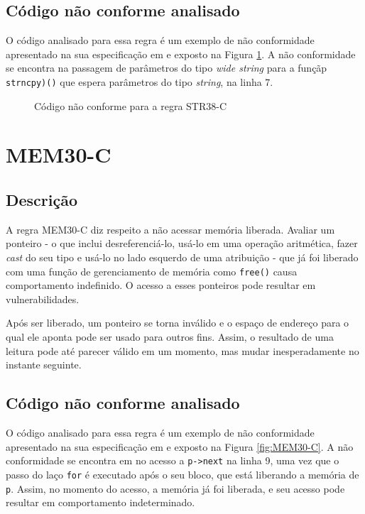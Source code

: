 \subsection{Código não conforme analisado}

O código analisado para essa regra é um exemplo de não conformidade apresentado na sua especificação em \cite{ccert} e exposto na Figura \ref{fig:STR38-C}. A não conformidade se encontra na passagem de parâmetros do tipo \textit{wide string} para a funçãp \texttt{strncpy)()} que espera parâmetros do tipo \textit{string}, na linha 7.

\begin{figure}[h!]
  \centering
  
  \caption{Código não conforme para a regra STR38-C}
\label{fig:STR38-C}
\end{figure}

\section{MEM30-C}
\subsection{Descrição}

A regra MEM30-C diz respeito a não acessar memória liberada. Avaliar um ponteiro - o que inclui desreferenciá-lo, usá-lo em uma operação aritmética, fazer \textit{cast} do seu tipo e usá-lo no lado esquerdo de uma atribuição - que já foi liberado com uma função de gerenciamento de memória como \texttt{free()} causa comportamento indefinido. O acesso a esses ponteiros pode resultar em vulnerabilidades.

Após ser liberado, um ponteiro se torna inválido e o espaço de endereço para o qual ele aponta pode ser usado para outros fins. Assim, o resultado de uma leitura pode até parecer válido em um momento, mas mudar inesperadamente no instante seguinte.

\subsection{Código não conforme analisado}

O código analisado para essa regra é um exemplo de não conformidade apresentado na sua especificação em \cite{ccert} e exposto na Figura \ref{fig:MEM30-C}. A não conformidade se encontra em no acesso a \texttt{p->next} na linha 9, uma vez que o passo do laço \texttt{for} é executado após o seu bloco, que está liberando a memória de \texttt{p}. Assim, no momento do acesso, a memória já foi liberada, e seu acesso pode resultar em comportamento indeterminado.

